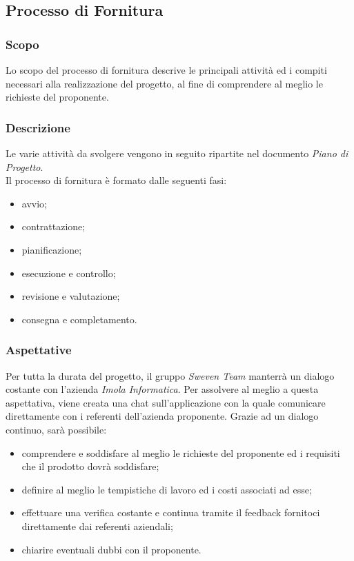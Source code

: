 \subsection{Processo di Fornitura}
\subsubsection{Scopo}
Lo scopo del processo di fornitura descrive le principali attività ed i compiti necessari alla realizzazione del 
progetto, al fine di comprendere al meglio le richieste del proponente.

\subsubsection{Descrizione}
Le varie attività da svolgere vengono in seguito ripartite nel documento \textit{Piano di Progetto}. \\
Il processo di fornitura è formato dalle seguenti fasi: 
\begin{itemize}
    \item avvio;
    \item contrattazione;
    \item pianificazione;
    \item esecuzione e controllo;
    \item revisione e valutazione;
    \item consegna e completamento.
\end{itemize}

\subsubsection{Aspettative}
Per tutta la durata del progetto, il gruppo \textit{Sweven Team} manterrà un dialogo costante con l'azienda \textit{Imola Informatica}. 
Per assolvere al meglio a questa aspettativa, viene creata una chat sull'applicazione  con la quale comunicare direttamente con i referenti dell'azienda proponente. 
Grazie ad un dialogo continuo, sarà possibile:
\begin{itemize}
\item comprendere e soddisfare al meglio le richieste del proponente ed i requisiti che il prodotto dovrà soddisfare;
\item definire al meglio le tempistiche di lavoro ed i costi associati ad esse;
\item effettuare una verifica costante e continua tramite il feedback fornitoci direttamente dai referenti aziendali;
\item chiarire eventuali dubbi con il proponente.
\end{itemize}

